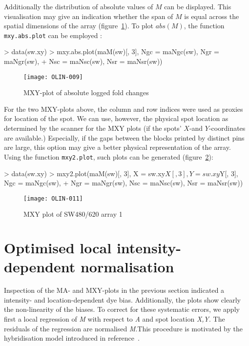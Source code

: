 \documentclass[a4paper,11pt]{article}
\begin{document}
Additionally the distribution of absolute values of $M$ can be displayed. This visualisation
may give an indication whether the span of $M$ is equal across the spatial dimensions of
the array (figure~\ref{mxyabsplot}). 
To plot $abs(M)$, the function \texttt{mxy.abs.plot} can be employed :


\begin{Schunk}
\begin{Sinput}
> data(sw.xy)
> mxy.abs.plot(maM(sw)[, 3], Ngc = maNgc(sw), Ngr = maNgr(sw), 
+     Nsc = maNsc(sw), Nsr = maNsr(sw))
\end{Sinput}
\end{Schunk}

\begin{figure}
\centering
\texttt{[image: OLIN-009]}
\caption{MXY-plot of absolute logged fold changes}
\label{mxyabsplot}
\end{figure}


For the two MXY-plots above, the column and row indices were used as proxies for location 
of the spot. We can use, however, the physical spot location as determined by the 
scanner for the MXY plots (if the spots' $X$-and $Y$-coordinates are available.) 
Especially, if the gaps between the blocks printed by distinct pins are large,
this option may give a better physical representation of the array.
Using the function \texttt{mxy2.plot}, such plots can be generated (figure~\ref{mxy2plot}): 

\begin{Schunk}
\begin{Sinput}
> data(sw.xy)
> mxy2.plot(maM(sw)[, 3], X = sw.xy$X[, 3], Y = sw.xy$Y[, 3], Ngc = maNgc(sw), 
+     Ngr = maNgr(sw), Nsc = maNsc(sw), Nsr = maNsr(sw))
\end{Sinput}
\end{Schunk}

\begin{figure}
\centering
\texttt{[image: OLIN-011]}
\caption{MXY plot of SW480/620 array 1}
\label{mxy2plot}
\end{figure}


\section{Optimised local intensity-dependent normalisation}
Inspection of the MA- and MXY-plots in the previous section indicated a intensity- and location-dependent dye 
bias. Additionally, the plots show clearly the non-linearity of the biases. To correct for these systematic errors,
 we apply first a local regression of \emph{M} with respect to \emph{A} and spot location \emph{X,Y}.
The residuals of the regression are normalised \emph{M}.This procedure is motivated by the hybridisation model introduced in reference~\cite{toni}.
\end{document}
